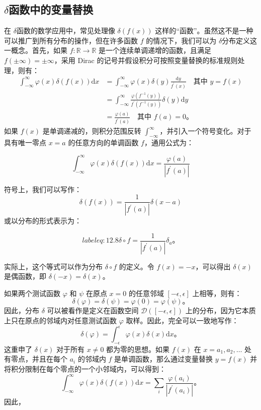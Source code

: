 \subsection{$\delta$函数中的变量替换}
在 $\delta$函数的数学应用中，常见处理像 $\delta(f(x))$
这样的``函数''。虽然这不是一种可以推广到所有分布的操作，但在许多函数
$f$ 的情况下，我们可以为 $\delta$分布定义这一概念。首先，如果
$f: \mathbb{R} \to \mathbb{R}$ 是一个连续单调递增的函数，且满足
$f(\pm \infty) = \pm \infty$，采用 Dirac
的记号并假设积分可按照变量替换的标准规则处理，则有：
 $$
\begin{aligned}
\int_{-\infty}^\infty \varphi(x) \delta(f(x)) \mathrm{d}x & = \int_{-\infty}^\infty \varphi(x) \delta(y) \frac{\mathrm{d}y}{f^{\prime}(x)} \quad \text{其中 } y = f(x) \\
& = \int_{-\infty}^\infty \frac{\varphi\left(f^{-1}(y)\right)}{f^{\prime}\left(f^{-1}(y)\right)} \delta(y) \mathrm{d}y \\
& = \frac{\varphi(a)}{f^{\prime}(a)} \quad \text{其中 } f(a) = 0。
\end{aligned}
$$
如果 $f(x)$ 是单调递减的，则积分范围反转
$\int_{-\infty}^\infty$，并引入一个符号变化。对于具有唯一零点
$x = a$ 的任意方向的单调函数 $f$，通用公式为：

\begin{equation} \label{eq:12.7}
 \int_{-\infty}^\infty \varphi(x) \delta(f(x)) \mathrm{d}x = \frac{\varphi(a)}{\left|f^{\prime}(a)\right|} 
 \end{equation}

符号上，我们可以写作：
 $$
\delta(f(x)) = \frac{1}{\left|f^{\prime}(a)\right|} \delta(x - a)
$$
或以分布的形式表示为：

\begin{equation} label{eq:12.8}
 \delta \circ f = \frac{1}{\left|f^{\prime}(a)\right|} \delta_a。 
 \end{equation}

实际上，这个等式可以作为分布 $\delta \circ f$ 的定义。令
$f(x) = -x$，可以得出 $\delta(x)$ 是偶函数，即
$\delta(-x) = \delta(x)$。

如果两个测试函数 $\varphi$ 和 $\psi$ 在原点 $x=0$ 的任意邻域
$[-\epsilon, \epsilon]$ 上相等，则有：
 $$
\delta(\varphi) = \delta(\psi) = \varphi(0) = \varphi(\psi)。
$$
因此，分布 $\delta$ 可以被看作是定义在函数空间
$\mathcal{D}([-\epsilon, \epsilon])$
上的分布，因为它本质上只在原点的邻域内对任意测试函数 $\varphi$
取样。因此，完全可以一致地写作：
 $$
\delta(\varphi) = \int_{-\epsilon}^\epsilon \varphi(x) \delta(x) \mathrm{d}x。
$$
这重申了 $\delta(x)$ 对于所有 $x \neq 0$ 都为零的思想。如果 $f(x)$
在 $x = a_1, a_2, \ldots$ 处有零点，并且在每个 $a_i$ 的邻域内 $f$
是单调函数，那么通过变量替换 $y = f(x)$
并将积分限制在每个零点的一个小邻域内，可以得到：
 $$
\int_{-\infty}^\infty \varphi(x) \delta(f(x)) \mathrm{d}x = \sum_{i} \frac{\varphi(a_i)}{\left|f^{\prime}(a_i)\right|}。
$$
因此，

